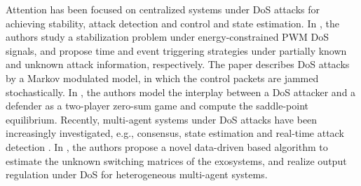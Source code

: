 \documentclass{autart}
\begin{document}
Attention has been focused on centralized systems under DoS attacks for achieving stability\cite{feng2020tac, 8353464}, attack detection and control \cite{bhowmick2020availability} and state estimation\cite{ding2018attacks}. 
In \cite{HSF-SM:16-siam}, the authors study a stabilization problem under energy-constrained PWM DoS signals, and propose time and event triggering strategies under partially known and unknown attack information, respectively.
The paper \cite{befekadu2015risk} describes DoS attacks by a Markov modulated model, in which the control packets are jammed stochastically. In \cite{gupta2016dynamic}, the authors model the interplay between a DoS attacker and a defender as a two-player zero-sum game and compute the saddle-point equilibrium.
Recently, multi-agent systems under DoS attacks have been increasingly investigated, e.g., consensus, state estimation and real-time attack detection \cite{xu2019distributed, amini2020rq, biron2018real}. 
In \cite{deng2022resilient}, the authors propose a 
novel data-driven based algorithm to estimate the unknown switching matrices of the exosystems, and realize output regulation under DoS for heterogeneous multi-agent systems.
\end{document}
